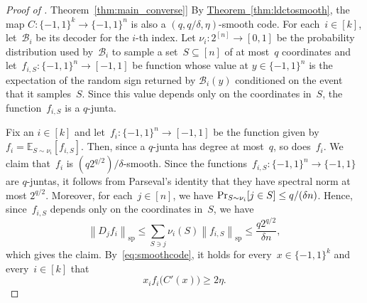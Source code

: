 \documentclass[11pt]{article}
\numberwithin{equation}{section}
\theoremstyle{definition}
\theoremstyle{plain}
\newcommand{\expref}[2]{\hyperref[#2]{#1~\ref{#2}}}
\newcommand{\pmset}[1]{\{-1,1\}^{#1}} %
\newcommand{\E}{\mathbb{E}}
\newcommand{\specnorm}[1]{\left\lVert #1 \right\rVert_{\mathrm{sp}}}
\renewcommand{\Pr}{\mbox{\rm Pr}}
\newcommand{\beq}{\begin{equation}}
\newcommand{\eeq}{\end{equation}}
\newcommand{\beqn}{\begin{equation*}}
\newcommand{\eeqn}{\end{equation*}}
\begin{document}
\begin{proof}[Proof of \expref{Theorem}{thm:main_converse}]
By \expref{Theorem}{thm:ldctosmooth}, the map $C:\pmset{k}\to\pmset{n}$ is also a $(q,q/\delta,\eta)$-smooth code. For each~$i\in[k]$, let~$\mathcal B_i$ be its decoder for the $i$-th %
index.
Let $\nu_i:2^{[n]}\to [0,1]$ be the probability distribution used by~$\mathcal B_i$ to sample a set~$S\subseteq[n]$ of at most~$q$ coordinates and 
 let~$f_{i,S}:\pmset{n}\to [-1,1]$ be function whose value at $y\in\pmset{n}$ is the expectation of the random sign returned by $\mathcal B_i(y)$ conditioned on the event that it samples~$S$. Since this value depends only on the coordinates in~$S$, the function~$f_{i,S}$ is a $q$-junta.

Fix an $i\in[k]$ and let~$f_i:\pmset{n}\to [-1,1]	$ be the function given by $f_i =\E_{S\sim\nu_i}[f_{i,S}]$.
Then, since a $q$-junta has degree at most~$q$, so does~$f_i$.
We claim that~$f_i$ is $(q2^{q/2})/\delta$-smooth.
Since the functions~$f_{i,S}:\pmset{n}\to\pmset{}$ are $q$-juntas, it follows from Parseval's identity that they have spectral norm at most $2^{q/2}$. 
Moreover, for each~$j\in[n]$, we have $\Pr_{S\sim\nu_i}[j\in S] \leq q/(\delta n)$.
Hence, since~$f_{i,S}$ depends only on the coordinates in~$S$, we have
\beqn
\specnorm{D_jf_i}
\leq
\sum_{S\ni j}\nu_i(S)\specnorm{f_{i,S}}
\leq
\frac{q2^{q/2}}{\delta n},
\eeqn
which gives the claim.
By~\eqref{eq:smoothcode}, it holds for every~$x\in\pmset{k}$ and every~$i\in[k]$ that
\beq\label{eq:smoothcode2}
x_if_i\big(C'(x)\big)\geq 2\eta.
\eeq


\end{proof}
\end{document}
